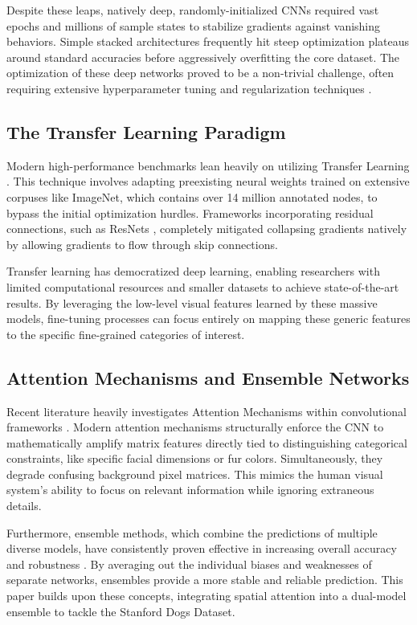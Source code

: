 \documentclass[conference]{IEEEtran}
\begin{document}
Despite these leaps, natively deep, randomly-initialized CNNs required vast epochs and millions of sample states to stabilize gradients against vanishing behaviors. Simple stacked architectures frequently hit steep optimization plateaus around standard accuracies before aggressively overfitting the core dataset. The optimization of these deep networks proved to be a non-trivial challenge, often requiring extensive hyperparameter tuning and regularization techniques \cite{b9}.

\subsection{The Transfer Learning Paradigm}
Modern high-performance benchmarks lean heavily on utilizing Transfer Learning \cite{b17}. This technique involves adapting preexisting neural weights trained on extensive corpuses like ImageNet, which contains over 14 million annotated nodes, to bypass the initial optimization hurdles. Frameworks incorporating residual connections, such as ResNets \cite{b6}, completely mitigated collapsing gradients natively by allowing gradients to flow through skip connections. 

Transfer learning has democratized deep learning, enabling researchers with limited computational resources and smaller datasets to achieve state-of-the-art results. By leveraging the low-level visual features learned by these massive models, fine-tuning processes can focus entirely on mapping these generic features to the specific fine-grained categories of interest.

\subsection{Attention Mechanisms and Ensemble Networks}
Recent literature heavily investigates Attention Mechanisms within convolutional frameworks \cite{b15}. Modern attention mechanisms structurally enforce the CNN to mathematically amplify matrix features directly tied to distinguishing categorical constraints, like specific facial dimensions or fur colors. Simultaneously, they degrade confusing background pixel matrices. This mimics the human visual system's ability to focus on relevant information while ignoring extraneous details.

Furthermore, ensemble methods, which combine the predictions of multiple diverse models, have consistently proven effective in increasing overall accuracy and robustness \cite{b4}. By averaging out the individual biases and weaknesses of separate networks, ensembles provide a more stable and reliable prediction. This paper builds upon these concepts, integrating spatial attention into a dual-model ensemble to tackle the Stanford Dogs Dataset.
\end{document}
